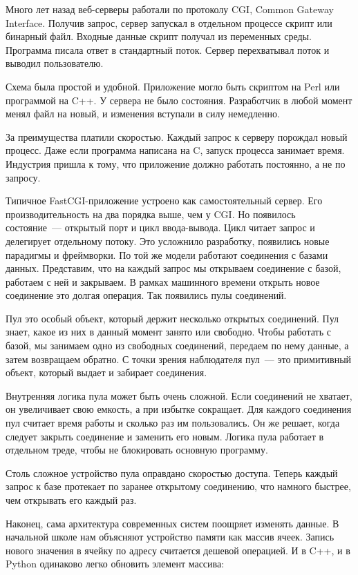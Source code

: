 Много лет назад веб-серверы работали по протоколу CGI, Common Gateway
Interface. Получив
запрос, сервер запускал в отдельном процессе скрипт или бинарный файл. Входные
данные скрипт получал из переменных среды. Программа писала ответ в стандартный
поток. Сервер перехватывал поток и выводил пользователю.

Схема была простой и удобной. Приложение могло быть скриптом на Perl или
программой на C++. У сервера не было состояния. Разработчик в любой момент менял
файл на новый, и изменения вступали в силу немедленно.

За преимущества платили скоростью. Каждый запрос к серверу порождал новый
процесс. Даже если программа написана на C, запуск процесса занимает
время. Индустрия пришла к тому, что приложение должно работать постоянно, а не
по запросу.

Типичное FastCGI-приложение устроено как самостоятельный сервер. Его
производительность на два порядка выше, чем у CGI. Но появилось состояние~---
открытый порт и цикл ввода-вывода. Цикл читает запрос и делегирует отдельному
потоку. Это усложнило разработку, появились новые парадигмы и фреймворки.
По той же модели работают соединения с базами данных. Представим, что на каждый
запрос мы открываем соединение с базой, работаем с ней и закрываем. В рамках
машинного времени открыть новое соединение это долгая операция. Так появились
пулы соединений.

Пул это особый объект, который держит несколько открытых соединений. Пул знает,
какое из них в данный момент занято или свободно. Чтобы работать с базой, мы
занимаем одно из свободных соединений, передаем по нему данные, а затем
возвращаем обратно. С точки зрения наблюдателя пул~--- это примитивный объект,
который выдает и забирает соединения.

Внутренняя логика пула может быть очень сложной. Если соединений не хватает, он
увеличивает свою емкость, а при избытке сокращает. Для каждого соединения пул
считает время работы и сколько раз им пользовались. Он же решает, когда следует
закрыть соединение и заменить его новым. Логика пула работает в отдельном треде,
чтобы не блокировать основную программу.

Столь сложное устройство пула оправдано скоростью доступа. Теперь каждый запрос
к базе протекает по заранее открытому соединению, что намного быстрее, чем
открывать его каждый раз.

Наконец, сама архитектура современных систем поощряет изменять данные. В
начальной школе нам объясняют устройство памяти как массив ячеек. Запись нового
значения в ячейку по адресу считается дешевой операцией. И в C++, и в Python
одинаково легко обновить элемент массива:

